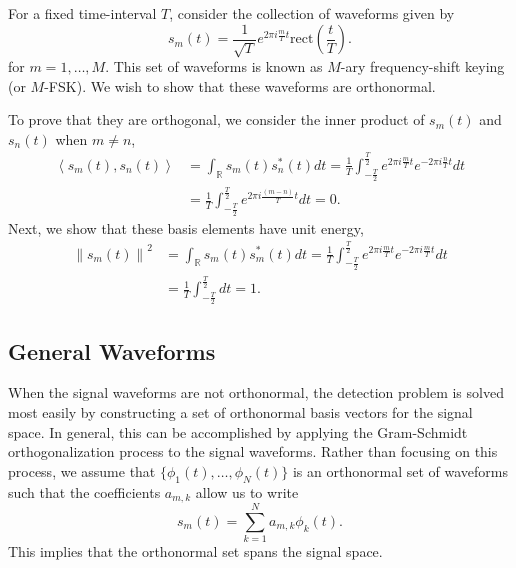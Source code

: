 \begin{example} \label{example:TSpacedTruncatedSinusoids}
For a fixed time-interval $T$, consider the collection of waveforms given by
\begin{equation*}
s_m(t) = \frac{1}{\sqrt{T}} e^{2 \pi i \frac{m}{T} t} \mathrm{rect} \left( \frac{t}{T} \right) .
\end{equation*}
for $m = 1, \ldots, M$.
This set of waveforms is known as $M$-ary frequency-shift keying (or $M$-FSK).
We wish to show that these waveforms are orthonormal.

To prove that they are orthogonal, we consider the inner product of $s_m(t)$ and $s_n(t)$ when $m \neq n$,
\begin{equation*}
\begin{split}
\left\langle s_m (t), s_n (t) \right\rangle
&= \int_{\mathbb{R}} s_m (t) s_n^* (t) dt 
= \frac{1}{T} \int_{-\frac{T}{2}}^{\frac{T}{2}}
e^{2 \pi i \frac{m}{T} t} e^{- 2 \pi i \frac{n}{T} t} dt \\
&= \frac{1}{T} \int_{-\frac{T}{2}}^{\frac{T}{2}}
e^{2 \pi i \frac{(m-n)}{T} t} dt
= 0 .
\end{split}
\end{equation*}
Next, we show that these basis elements have unit energy,
\begin{equation*}
\begin{split}
\left\| s_m(t) \right\|^2
&= \int_{\mathbb{R}} s_m (t) s_m^* (t) dt 
= \frac{1}{T} \int_{-\frac{T}{2}}^{\frac{T}{2}}
e^{2 \pi i \frac{m}{T} t} e^{- 2 \pi i \frac{m}{T} t} dt \\
&= \frac{1}{T} \int_{-\frac{T}{2}}^{\frac{T}{2}} dt
= 1 .
\end{split}
\end{equation*}
\end{example}

\subsection{General Waveforms}

When the signal waveforms are not orthonormal, the detection problem is solved most easily by constructing a set of orthonormal basis vectors for the signal space.
In general, this can be accomplished by applying the Gram-Schmidt orthogonalization process to the signal waveforms.
Rather than focusing on this process, we assume that $\{ \phi_1 (t), \ldots , \phi_N (t) \}$ is an orthonormal set of waveforms such that the coefficients $a_{m,k}$ allow us to write
\[ s_m (t) = \sum_{k=1}^N a_{m,k} \phi_k (t). \]
This implies that the orthonormal set spans the signal space.

